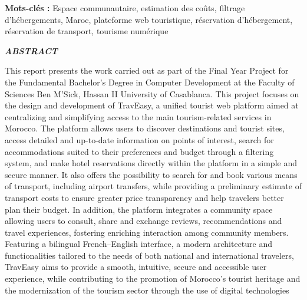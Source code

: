 \documentclass[a4paper,12pt]{report}
\begin{document}
\textbf{Mots-clés :} Espace communautaire, estimation des coûts, filtrage d'hébergements, Maroc, plateforme web touristique, réservation d'hébergement, réservation de transport, tourisme numérique

\newpage
{}
\vspace*{0.5cm}
\begin{center}
    {\LARGE\textbf{\textit{ABSTRACT}}}
\end{center}
\vspace{2cm}





This report presents the work carried out as part of the Final Year Project for the Fundamental Bachelor's Degree in Computer Development at the Faculty of Sciences Ben M'Sick, Hassan II University of Casablanca. This project focuses on the design and development of TravEasy, a unified tourist web platform aimed at centralizing and simplifying access to the main tourism-related services in Morocco.
The platform allows users to discover destinations and tourist sites, access detailed and up-to-date information on points of interest, search for accommodations suited to their preferences and budget through a filtering system, and make hotel reservations directly within the platform in a simple and secure manner. It also offers the possibility to search for and book various means of transport, including airport transfers, while providing a preliminary estimate of transport costs to ensure greater price transparency and help travelers better plan their budget. In addition, the platform integrates a community space allowing users to consult, share and exchange reviews, recommendations and travel experiences, fostering enriching interaction among community members. Featuring a bilingual French–English interface, a modern architecture and functionalities tailored to the needs of both national and international travelers, TravEasy aims to provide a smooth, intuitive, secure and accessible user experience, while contributing to the promotion of Morocco's tourist heritage and the modernization of the tourism sector through the use of digital technologies
\vspace{2cm}
\end{document}

